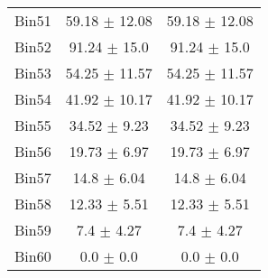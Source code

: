 \begin{tabular}{|c|c|c|}
     Bin51 & 59.18 $\pm$ 12.08 & 59.18 $\pm$ 12.08 \\ \cline{1-3} 
     Bin52 & 91.24 $\pm$ 15.0 & 91.24 $\pm$ 15.0 \\ \cline{1-3} 
     Bin53 & 54.25 $\pm$ 11.57 & 54.25 $\pm$ 11.57 \\ \cline{1-3} 
     Bin54 & 41.92 $\pm$ 10.17 & 41.92 $\pm$ 10.17 \\ \cline{1-3} 
     Bin55 & 34.52 $\pm$ 9.23 & 34.52 $\pm$ 9.23 \\ \cline{1-3} 
     Bin56 & 19.73 $\pm$ 6.97 & 19.73 $\pm$ 6.97 \\ \cline{1-3} 
     Bin57 & 14.8 $\pm$ 6.04 & 14.8 $\pm$ 6.04 \\ \cline{1-3} 
     Bin58 & 12.33 $\pm$ 5.51 & 12.33 $\pm$ 5.51 \\ \cline{1-3} 
     Bin59 & 7.4 $\pm$ 4.27 & 7.4 $\pm$ 4.27 \\ \cline{1-3} 
     Bin60 & 0.0 $\pm$ 0.0 & 0.0 $\pm$ 0.0 \\ \cline{1-3} 
  \end{tabular}
